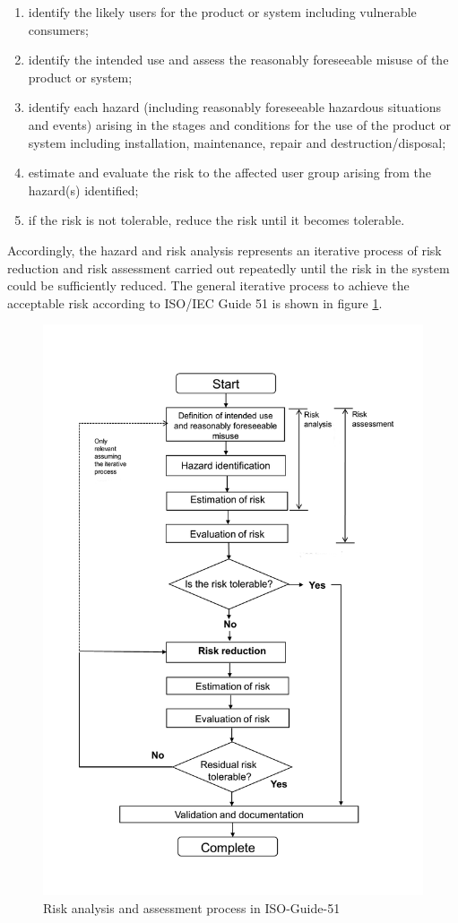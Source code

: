 \documentclass{template/openetcs_report}
\begin{document}
\begin{enumerate}
\item identify the likely users for the product or system including vulnerable consumers; 
\item identify the intended use and assess the reasonably foreseeable misuse of the product or system; 
\item identify each hazard (including reasonably foreseeable hazardous situations and events) arising in the stages and conditions for the use of the product or system including installation, maintenance, repair and destruction/disposal; 
\item estimate and evaluate the risk to the affected user group arising from the hazard(s) identified;
\item if the risk is not tolerable, reduce the risk until it becomes tolerable.
\end{enumerate}

Accordingly, the hazard and risk analysis represents an iterative process of risk reduction and risk assessment carried out repeatedly until the risk in the system could be sufficiently reduced. The general iterative process to achieve the acceptable risk according to ISO/IEC Guide 51 is shown in figure \ref{fig:risk-analysis}.

\begin{figure}[htbp]
\centering
\includegraphics[width=0.6\linewidth]{ISO-Guide-51-risk-analysis-and-assessment}
\caption{Risk analysis and assessment process in ISO-Guide-51}
\label{fig:risk-analysis}
\end{figure}
\end{document}
